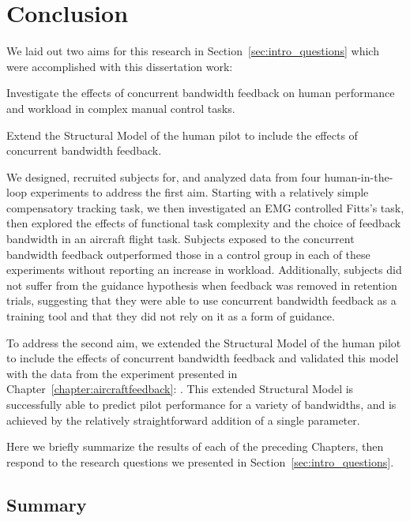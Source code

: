\chapter{Conclusion}
\label{chap:conclusion}

We laid out two aims for this research in Section~\ref{sec:intro_questions} which were accomplished with this dissertation work:
\begin{description}[align=left]
    \item [Aim One] Investigate the effects of concurrent bandwidth feedback on human performance and workload in complex manual control tasks.
    \item [Aim Two] Extend the Structural Model of the human pilot to include the effects of concurrent bandwidth feedback.
\end{description}

We designed, recruited subjects for, and analyzed data from four human-in-the-loop experiments to address the first aim.
Starting with a relatively simple compensatory tracking task, we then investigated an EMG controlled Fitts's task, then explored the effects of functional task complexity and the choice of feedback bandwidth in an aircraft flight task.
Subjects exposed to the concurrent bandwidth feedback outperformed those in a control group in each of these experiments without reporting an increase in workload.
Additionally, subjects did not suffer from the guidance hypothesis when feedback was removed in retention trials, suggesting that they were able to use concurrent bandwidth feedback as a training tool and that they did not rely on it as a form of guidance.

To address the second aim, we extended the Structural Model of the human pilot to include the effects of concurrent bandwidth feedback and validated this model with the data from the experiment presented in Chapter~\ref{chapter:aircraftfeedback}: .
This extended Structural Model is successfully able to predict pilot performance for a variety of bandwidths, and is achieved by the relatively straightforward addition of a single parameter.

Here we briefly summarize the results of each of the preceding Chapters, then respond to the research questions we presented in Section~\ref{sec:intro_questions}.

\section{Summary}

